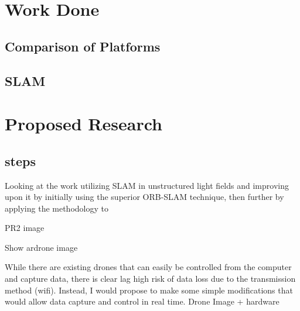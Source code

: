 \documentclass[12pt]{report}
\begin{document}
\chapter{Work Done}
\section{Comparison of Platforms}
\section{SLAM}

\chapter{Proposed Research}
\section{steps}
Looking at the work utilizing SLAM in unstructured light fields and improving upon it by initially using the superior ORB-SLAM technique, then further by applying the methodology to 

PR2 image

Show ardrone image

While there are existing drones that can easily be controlled from the computer and capture data, there is clear lag high risk of data loss due to the transmission method (wifi). Instead, I would propose to make some simple modifications that would allow data capture and control in real time.
Drone Image + hardware
\end{document}
